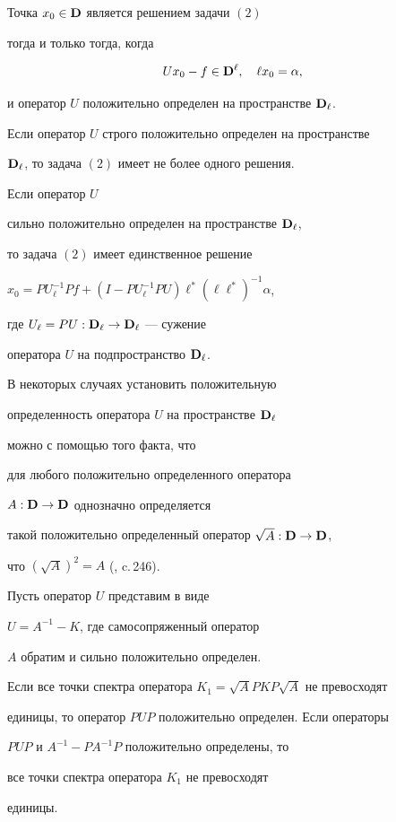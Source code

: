 \begin{thm}


Точка $x_0\in\bold D$ является решением задачи $(2)$


тогда и только тогда, когда


$$


Ux_0-f\in\spc{D}^\ell,\quad


\ell x_0=\alpha,


$$


и оператор $U$ положительно определен на пространстве $\bold D_\ell$.


Если оператор $U$ строго положительно определен на пространстве


$\bold D_\ell$, то задача $(2)$ имеет не более одного решения.


Если оператор $U$


сильно положительно определен на пространстве $\bold D_\ell$,


то задача $(2)$ имеет единственное решение


$x_0=PU_\ell^{-1}Pf+(I-PU_\ell^{-1}PU)\ell^*(\ell\ell^*)^{-1}\alpha$,


где $U_\ell=PU:\bold D_\ell\to\bold D_\ell$ --- сужение


оператора $U$ на подпространство $\bold D_\ell$.


\end{thm}





В некоторых случаях установить положительную


определенность оператора $U$ на пространстве $\bold D_\ell$


можно с помощью того факта, что


для любого положительно определенного оператора


$A:\bold D\to\bold D$ однозначно определяется


такой положительно определенный оператор $\sqrt{A}:\bold D\to\bold D$,


что $(\sqrt{A})^2=A$ (\cite{LS}, c.\,246).





\begin{thm}


Пусть оператор $U$ представим в виде


$U=A^{-1}-K$, где самосопряженный оператор


$A$ обратим и сильно положительно определен.


Если все точки спектра оператора $K_1=\sqrt{A}PKP\sqrt{A}$ не превосходят


единицы, то оператор $PUP$ положительно определен. Если операторы


$PUP$ и $A^{-1}-PA^{-1}P$ положительно определены, то


все точки спектра оператора $K_1$ не превосходят


единицы.


\end{thm}





